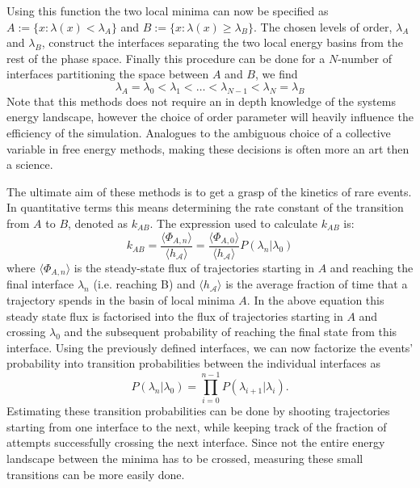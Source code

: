 Using this function the two local minima can
now be specified as $A := \{x: \lambda(x) < \lambda_A\} $ and $B := \{x: \lambda(x) \geq
\lambda_B\} $. The chosen levels of order, $\lambda_A$ and $\lambda_B$, construct the
interfaces separating the two local energy basins from the rest of the
phase space. Finally this procedure can be done for a $N$-number of interfaces
partitioning the space between $A$ and  $B$, we find
\begin{equation}
\lambda_A = \lambda_0 < \lambda_1< \dots < \lambda_{N-1} < \lambda_N = \lambda_B
\end{equation}
Note that this methods does not require an in depth knowledge of the systems energy
landscape, however the choice of order parameter will heavily influence the
efficiency of the simulation. Analogues to the ambiguous choice of a collective variable
in free energy methods, making these decisions is often more an art then a science.

The ultimate aim of these methods is to get a grasp of the kinetics of rare events. In
quantitative terms this means determining the rate constant of the transition
from $A$ to  $B$, denoted as $k_{AB}$. The expression used to calculate $k_{AB}$ is:
 \begin{equation}
    k_{AB} = \frac{\langle \Phi_{A,n} \rangle}{\langle h_{\mathcal{A}}\rangle} =
    \frac{\langle \Phi_{A,0} \rangle}{\langle h_{\mathcal{A}}\rangle}
    P(\lambda_n|\lambda_0)
 \end{equation}
 where $\langle \Phi_{A,n} \rangle$ is the steady-state flux of trajectories starting in
 $A$ and reaching the final interface $\lambda_n$ (i.e. reaching B) and
$\langle h_{\mathcal{A}}\rangle$ is the average fraction of time that  a trajectory
spends in the basin of local minima $A$. In the above equation this steady state flux is
factorised into the flux of trajectories starting in $A$ and crossing $\lambda_0$ and the
subsequent probability of reaching the final state from this
interface. Using the previously defined interfaces, we can now factorize the events'
probability into transition probabilities between the individual interfaces as
\begin{equation}
    P(\lambda_n|\lambda_0) = \prod_{i=0}^{n-1} P(\lambda_{i+1}|\lambda_i).
 \end{equation}
Estimating these transition probabilities can be done by shooting trajectories starting
from one interface to the next, while keeping track of the fraction of attempts
successfully crossing the next interface. Since not the entire energy landscape between
the minima has to be crossed, measuring these small transitions can be more easily done.

